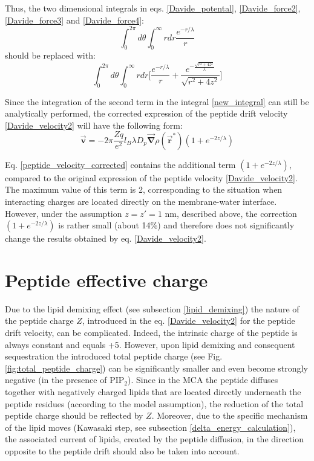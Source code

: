 Thus, the two dimensional integrals in eqs. \eqref{Davide_potental}, \eqref{Davide_force2}, \eqref{Davide_force3} and \eqref{Davide_force4}:
\begin{equation}
 \int_0^{2\pi} d\theta \int_0^\infty r dr \frac{e^{-r/\lambda}}{r}
\end{equation}
should be replaced with:
\begin{equation}
\label{new_integral}
 \int_0^{2\pi} d\theta \int_0^\infty r dr \Bigg[\frac{e^{-r/\lambda}}{r} + \frac{e^{-\frac{\sqrt{r^2+4z^2}}{\lambda}}}{\sqrt{r^2+4z^2}}\Bigg]
\end{equation}

Since the integration of the second term in the integral \eqref{new_integral} can still be analytically performed, the corrected expression of the peptide drift velocity \eqref{Davide_velocity2} will have the following form:
\begin{equation}
 \label{peptide_velocity_corrected}
 \vec{\mathbf{v}} =  -2\pi\frac{Zq}{e^2} l_B \lambda D_p \vec{\mathbf{\nabla}}\rho(\vec{\mathbf{r}}^*)(1+e^{-2z/\lambda})
\end{equation}

Eq. \eqref{peptide_velocity_corrected} contains the additional term $(1+e^{-2z/\lambda})$, compared to the original expression of the peptide velocity \eqref{Davide_velocity2}. The maximum value of this term is 2, corresponding to the situation when interacting charges are located directly on the membrane-water interface. However, under the assumption $z = z' = 1$ nm, described above, the correction $(1+e^{-2z/\lambda})$ is rather small (about 14\%) and therefore does not significantly change the results obtained by eq. \eqref{Davide_velocity2}.

\section{Peptide effective charge}

\label{description_peptide_effective_charge}

Due to the lipid demixing effect (see subsection \ref{lipid_demixing}) the nature of the peptide charge $Z$, introduced in the eq. \eqref{Davide_velocity2} for the peptide drift velocity, can be complicated. Indeed, the intrinsic charge of the peptide is always constant and equals +5. However, upon lipid demixing and consequent sequestration the introduced total peptide charge (see Fig. \ref{fig:total_peptide_charge}) can be significantly smaller and even become strongly negative (in the presence of PIP$_2$). Since in the MCA the peptide diffuses together with negatively charged lipids that are located directly underneath the peptide residues (according to the model assumption), the reduction of the total peptide charge should be reflected by $Z$. Moreover, due to the specific mechanism of the lipid moves (Kawasaki step, see subsection \ref{delta_energy_calculation}), the associated current of lipids, created by the peptide diffusion, in the direction opposite to the peptide drift should also be taken into account.

